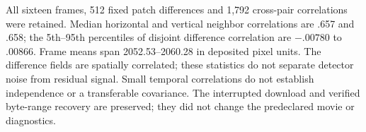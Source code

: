 All sixteen frames, 512 fixed patch differences and 1,792 cross-pair
correlations were retained. Median horizontal and vertical neighbor
correlations are .657 and .658; the 5th--95th percentiles of disjoint
difference correlation are $-.00780$ to $.00866$. Frame means span
2052.53--2060.28 in deposited pixel units. The difference fields are spatially
correlated; these statistics do not separate detector noise from residual
signal. Small temporal correlations do not establish independence or a
transferable covariance.
The interrupted download and verified byte-range recovery are preserved;
they did not change the predeclared movie or diagnostics.


